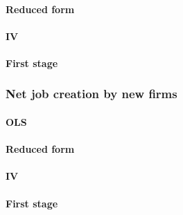 \documentclass[7pt,english]{article}
\theoremstyle{remark}
\begin{document}
\paragraph{Reduced form}
\begin{table}[h]
	
\end{table}

\paragraph{IV}
\begin{table}[h]
	
\end{table}

\paragraph{First stage}
\begin{table}[h]
	
\end{table}

\newpage
\subsubsection{Net job creation by new firms}
\paragraph{OLS}
\begin{table}[h]
	
\end{table}

\newpage
\paragraph{Reduced form}
\begin{table}[h]
	
\end{table}

\paragraph{IV}
\begin{table}[h]
	
\end{table}

\paragraph{First stage}
\begin{table}[h]
	
\end{table}
\end{document}
